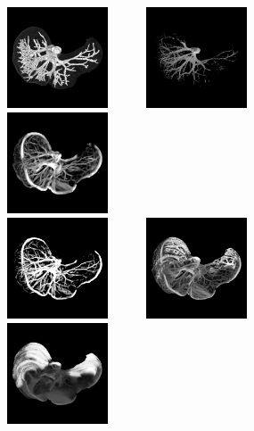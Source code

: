 \begin{figure}[!ht]
  \centering
  \includegraphics[clip = true, trim  =  10 150 10 150, height=3cm,width=4cm]{Images/Ircad_GT.png}
  \includegraphics[clip = true, trim  =  10 150 10 150, height=3cm,width=4cm]{Images/Ircad_Baseline.png}
  \includegraphics[clip = true, trim  =  10 150 10 150, height=3cm,width=4cm]{Images/Ircad_Frangi.png} \\
  \includegraphics[clip = true, trim  =  10 150 10 150, height=3cm,width=4cm]{Images/Ircad_Jerman.png}
  \includegraphics[clip = true, trim  =  10 150 10 150, height=3cm,width=4cm]{Images/Ircad_OOF_GM.png}
  \includegraphics[clip = true, trim  =  10 150 10 150, height=3cm,width=4cm]{Images/Ircad_Meijering.png} \\

\end{figure}
